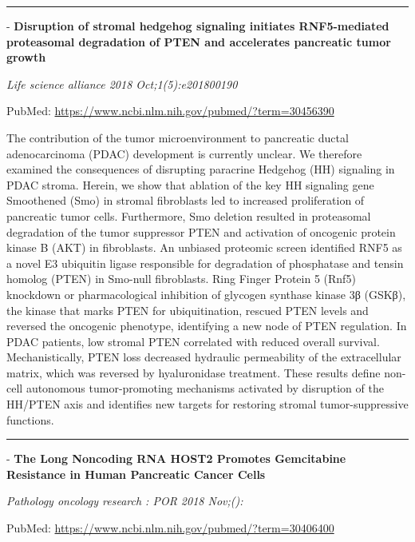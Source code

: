 \documentclass[]{article}
\begin{document}
{}

{}

\begin{center}\rule{0.5\linewidth}{\linethickness}\end{center}

 - \textbf{Disruption of stromal hedgehog signaling initiates
RNF5-mediated proteasomal degradation of PTEN and accelerates pancreatic
tumor growth}

\emph{Life science alliance 2018 Oct;1(5):e201800190}

PubMed: \url{https://www.ncbi.nlm.nih.gov/pubmed/?term=30456390}

The contribution of the tumor microenvironment to pancreatic ductal
adenocarcinoma (PDAC) development is currently unclear. We therefore
examined the consequences of disrupting paracrine Hedgehog (HH)
signaling in PDAC stroma. Herein, we show that ablation of the key HH
signaling gene Smoothened (Smo) in stromal fibroblasts led to increased
proliferation of pancreatic tumor cells. Furthermore, Smo deletion
resulted in proteasomal degradation of the tumor suppressor PTEN and
activation of oncogenic protein kinase B (AKT) in fibroblasts. An
unbiased proteomic screen identified RNF5 as a novel E3 ubiquitin ligase
responsible for degradation of phosphatase and tensin homolog (PTEN) in
Smo-null fibroblasts. Ring Finger Protein 5 (Rnf5) knockdown or
pharmacological inhibition of glycogen synthase kinase 3β (GSKβ), the
kinase that marks PTEN for ubiquitination, rescued PTEN levels and
reversed the oncogenic phenotype, identifying a new node of PTEN
regulation. In PDAC patients, low stromal PTEN correlated with reduced
overall survival. Mechanistically, PTEN loss decreased hydraulic
permeability of the extracellular matrix, which was reversed by
hyaluronidase treatment. These results define non-cell autonomous
tumor-promoting mechanisms activated by disruption of the HH/PTEN axis
and identifies new targets for restoring stromal tumor-suppressive
functions.

{}

{}

\begin{center}\rule{0.5\linewidth}{\linethickness}\end{center}

 - \textbf{The Long Noncoding RNA HOST2 Promotes Gemcitabine Resistance
in Human Pancreatic Cancer Cells}

\emph{Pathology oncology research : POR 2018 Nov;():}

PubMed: \url{https://www.ncbi.nlm.nih.gov/pubmed/?term=30406400}
\end{document}
